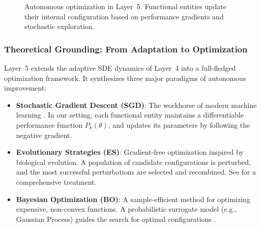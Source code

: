 \begin{figure}[htbp]
    \centering
    \caption{Autonomous optimization in Layer~5. Functional entities update their internal configuration based on performance gradients and stochastic exploration.}
    \label{fig:layer5}
\end{figure}

\subsubsection{Theoretical Grounding: From Adaptation to Optimization}
Layer~5 extends the adaptive SDE dynamics of Layer~4 into a full-fledged optimization framework. It synthesizes three major paradigms of autonomous improvement:

\begin{itemize}
    \item \textbf{Stochastic Gradient Descent (SGD)}: The workhorse of modern machine learning \cite{sutton2018}. In our setting, each functional entity maintains a differentiable performance function $P_k(\theta)$, and updates its parameters by following the negative gradient.
    \item \textbf{Evolutionary Strategies (ES)}: Gradient-free optimization inspired by biological evolution. A population of candidate configurations is perturbed, and the most successful perturbations are selected and recombined. See \cite{beyer2002evolutionary} for a comprehensive treatment.
    \item \textbf{Bayesian Optimization (BO)}: A sample-efficient method for optimizing expensive, non-convex functions. A probabilistic surrogate model (e.g., Gaussian Process) guides the search for optimal configurations \cite{snoek2012practical}.
\end{itemize}

